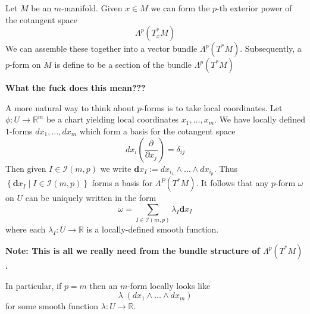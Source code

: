 \documentclass[11pt]{article}
\newcommand{\defeq}{:=}
\newcommand{\relmiddle}[1]{\mathrel{}\middle#1\mathrel{}}
\newcommand{\rmv}{\relmiddle|}
\newcommand{\R}{\mathbb{R}}
\newcommand*{\pd}[3][]{\ensuremath{\frac{\partial^{#1} {#2}}{\partial {#3}^{#1}}}}
\newcommand{\mv}[1]{\textbf{#1}}
\newenvironment{defin}
	{\begin{mdframed}[backgroundcolor=white, roundcorner=5pt, linewidth=1pt]
		\setlength{\parindent}{0pt}
		}
	{\end{mdframed}}
\newcommand{\mdf}[1]{{\color{red} #1}}
\newenvironment{note}
	{\begin{mdframed}[backgroundcolor=white, linecolor=red, roundcorner=5pt, linewidth=1pt]\bfseries{Note:}\normalfont}
	{\end{mdframed}}
\begin{document}
\begin{defin}
Let $M$ be an $m$-manifold.
Given $x\in M$ we can form the $p$-th exterior power of the cotangent space
\[
	\Lambda^p (T_x^\ast M)
\]
We can assemble these together into a vector bundle $\Lambda^p(T^\ast M)$.
Subsequently, a \mdf{$p$-form} on $M$ is define to be a section of the bundle $\Lambda^p(T^\ast M)$	
\end{defin}

\noindent\textbf{What the fuck does this mean???}

A more natural way to think about $p$-forms is to take local coordinates.
Let $\phi: U \to \R^m$ be a chart yielding local coordinates $x_1, \dots , x_m$.
We have locally defined $1$-forms $dx_1, \dots , dx_m$ which form a basis for the cotangent space
\[
	dx_i\left(\pd{}{x_j}\right)=\delta_{ij}
\]
Then given $I\in\mathcal{I}(m, p)$ we write $\mv{d}x_I\defeq d{x_{i_1}} \wedge \dots \wedge d{x_{i_p}}$.
Thus $\left\{ \mv{d}x_I \rmv I \in\mathcal{I}(m, p)\right\}$ forms a basis for $\Lambda^P(T^\ast M)$.
It follows that any $p$-form $\omega$ on $U$ can be uniquely written in the form
\[
	\omega = \sum_{I\in\mathcal{I}(m,p)}\lambda_I\mv{d}x_I
\]
where each $\lambda_I:U \to \R$ is a locally-defined smooth function.
\begin{note}
	This is all we really need from the bundle structure of $\Lambda^p(T^\ast M)$.
\end{note}

In particular, if $p=m$ then an $m$-form locally looks like
\[
	\lambda \; (dx_1 \wedge \dots \wedge dx_m)
\]
for some smooth function $\lambda: U \to \R$.
\end{document}
